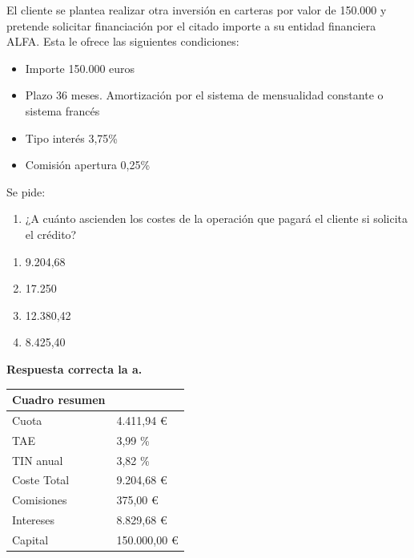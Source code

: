\documentclass[
  letterpaper,
  DIV=11,
  numbers=noendperiod]{scrreprt}
\providecommand{\tightlist}{%
  \setlength{\itemsep}{0pt}\setlength{\parskip}{0pt}}\usepackage{longtable,booktabs,array}
\begin{document}
\begin{tcolorbox}
El cliente se plantea realizar otra inversión en carteras por valor de
150.000 y pretende solicitar financiación por el citado importe a su
entidad financiera ALFA. Esta le ofrece las siguientes condiciones:

\begin{itemize}
\item
  Importe 150.000 euros
\item
  Plazo 36 meses. Amortización por el sistema de mensualidad constante o
  sistema francés
\item
  Tipo interés 3,75\%
\item
  Comisión apertura 0,25\%
\end{itemize}

Se pide:

\begin{enumerate}
\def\labelenumi{\arabic{enumi}.}
\tightlist
\item
  ¿A cuánto ascienden los costes de la operación que pagará el cliente
  si solicita el crédito?
\end{enumerate}

\begin{enumerate}
\def\labelenumi{\alph{enumi}.}
\item
  9.204,68
\item
  17.250
\item
  12.380,42
\item
  8.425,40
\end{enumerate}

\begin{tcolorbox}[enhanced jigsaw, toprule=.15mm, left=2mm, breakable, opacitybacktitle=0.6, toptitle=1mm, coltitle=black, arc=.35mm, leftrule=.75mm, bottomtitle=1mm, titlerule=0mm, title=\textcolor{quarto-callout-tip-color}{\faLightbulb}\hspace{0.5em}{Solución}, rightrule=.15mm, opacityback=0, bottomrule=.15mm, colback=white, colframe=quarto-callout-tip-color-frame, colbacktitle=quarto-callout-tip-color!10!white]

\textbf{Respuesta correcta la a.}

\begin{longtable}[]{@{}ll@{}}
\toprule\noalign{}
Cuadro resumen & \\
\midrule\noalign{}
\endhead
\bottomrule\noalign{}
\endlastfoot
Cuota & 4.411,94 € \\
TAE & 3,99 \% \\
TIN anual & 3,82 \% \\
Coste Total & 9.204,68 € \\
Comisiones & 375,00 € \\
Intereses & 8.829,68 € \\
Capital & 150.000,00 € \\
\end{longtable}


\end{tcolorbox}
\end{tcolorbox}
\end{document}
